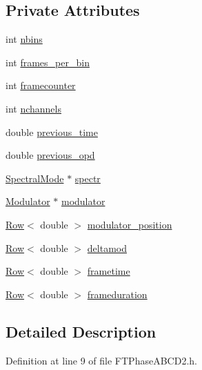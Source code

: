\subsection*{Private Attributes}
\begin{DoxyCompactItemize}
\item 
int \hyperlink{classFTPhaseABCD2_acbcfd8097caa8e93a79957b479448202}{nbins}
\item 
int \hyperlink{classFTPhaseABCD2_a819bc8d77a0005500876c87b9b08dab3}{frames\_\-per\_\-bin}
\item 
int \hyperlink{classFTPhaseABCD2_ab20a33f32bb64bb904caf74197593f2d}{framecounter}
\item 
int \hyperlink{classFTPhaseABCD2_a5353d092d53889e894f4c9f215c879cf}{nchannels}
\item 
double \hyperlink{classFTPhaseABCD2_a527852fce847c75999c7965fe50b7004}{previous\_\-time}
\item 
double \hyperlink{classFTPhaseABCD2_ac2491fdeea3af6651de745eed482db2b}{previous\_\-opd}
\item 
\hyperlink{classSpectralMode}{SpectralMode} $\ast$ \hyperlink{classFTPhaseABCD2_a67e7dfc25f4d00d204a71361c8a15195}{spectr}
\item 
\hyperlink{classModulator}{Modulator} $\ast$ \hyperlink{classFTPhaseABCD2_a1755a23fa779636dab93ffb9c9b93e6b}{modulator}
\item 
\hyperlink{classRow}{Row}$<$ double $>$ \hyperlink{classFTPhaseABCD2_a248bbc1dccd7a072e8e61710e4ae2259}{modulator\_\-position}
\item 
\hyperlink{classRow}{Row}$<$ double $>$ \hyperlink{classFTPhaseABCD2_adb45ef3385f322f04a5fae6a4fc5f8d0}{deltamod}
\item 
\hyperlink{classRow}{Row}$<$ double $>$ \hyperlink{classFTPhaseABCD2_a8a835c4c65a6bc45a0032aeced937be6}{frametime}
\item 
\hyperlink{classRow}{Row}$<$ double $>$ \hyperlink{classFTPhaseABCD2_abedbf8d6e352a94657090c240ae5b567}{frameduration}
\end{DoxyCompactItemize}


\subsection{Detailed Description}


Definition at line 9 of file FTPhaseABCD2.h.



